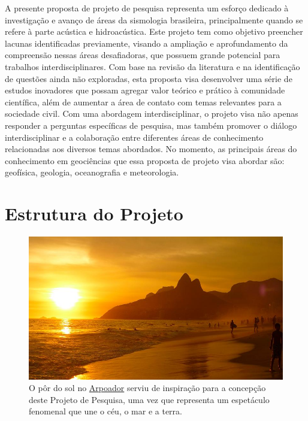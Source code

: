 \documentclass[10pt,a4paper,oneside]{book}
\newcommand{\HeroFigPad}{\vspace{-1cm}}
\begin{document}
\bigskip	

A presente proposta de projeto de pesquisa representa um esforço dedicado à investigação e avanço de áreas da sismologia brasileira, principalmente quando se refere à parte acústica e hidroacústica. Este projeto tem como objetivo preencher lacunas identificadas previamente, visando a ampliação e aprofundamento da compreensão nessas áreas desafiadoras, que possuem grande potencial para trabalhos interdisciplinares. Com base na revisão da literatura e na identificação de questões ainda não exploradas, esta proposta visa desenvolver uma série de estudos inovadores que possam agregar valor teórico e prático à comunidade científica, além de aumentar a área de contato com temas relevantes para a sociedade civil. Com uma abordagem interdisciplinar, o projeto visa não apenas responder a perguntas específicas de pesquisa, mas também promover o diálogo interdisciplinar e a colaboração entre diferentes áreas de conhecimento relacionadas aos diversos temas abordados. No momento, as principais áreas do conhecimento em geociências que essa proposta de projeto visa abordar são: geofísica, geologia, oceanografia e meteorologia.  


\chapter{Estrutura do Projeto}
\label{cap_estrutura}

\begin{figure}[h]
	\HeroFigPad
	\begin{center}
		\includegraphics[width=\textwidth]{images/arpoador.jpg}
	\end{center}
	\caption{
	O pôr do sol no \href{https://pt.wikipedia.org/wiki/Arpoador}{Arpoador} serviu de inspiração para a concepção deste Projeto de Pesquisa, uma vez que representa um espetáculo fenomenal que une o céu, o mar e a terra.
    }
 \label{fig_arpoador}
\end{figure}
\end{document}
